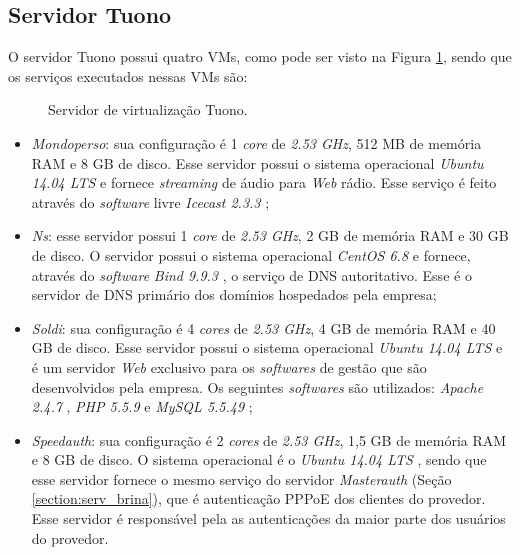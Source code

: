 \subsection{Servidor Tuono}
\label{section:serv_tuono}

O servidor Tuono possui quatro \ac{VM}s, como pode ser visto na Figura \ref{fig:servidor_tuono}, sendo que os serviços executados nessas \ac{VM}s
são:

\begin{figure}[h!]
 \centering
 \caption{Servidor de virtualização Tuono.}
 \label{fig:servidor_tuono}
\end{figure}

\begin{itemize}
 \item \textit{Mondoperso}: sua configuração é 1 \textit{core} de \textit{2.53 GHz}, 512 MB de memória \ac{RAM} e 8 GB de disco. 
 Esse servidor possui o sistema operacional \textit{Ubuntu 14.04 \ac{LTS}} \cite{ubuntu} e fornece \textit{streaming} de áudio para \textit{Web} 
 rádio. Esse serviço é feito através do \textit{software} livre \textit{Icecast 2.3.3} \cite{icecast};
 
 \item \textit{Ns}: esse servidor possui 1 \textit{core} de \textit{2.53 GHz}, 2 GB de memória \ac{RAM} e 30 GB de disco. O servidor possui o sistema 
 operacional \textit{CentOS 6.8} \cite{centos} e fornece, através do \textit{software} \textit{Bind 9.9.3} \cite{bind}, o serviço de \ac{DNS} 
 autoritativo. Esse é o servidor de \ac{DNS} primário dos domínios hospedados pela empresa;

 \item \textit{Soldi}: sua configuração é 4 \textit{cores} de \textit{2.53 GHz}, 4 GB de memória \ac{RAM} e 40 GB de disco. 
 Esse servidor possui o sistema operacional \textit{Ubuntu 14.04 \ac{LTS}} \cite{ubuntu} e é um servidor \textit{Web} exclusivo para os
 \textit{softwares} de gestão que são desenvolvidos pela empresa. Os seguintes \textit{softwares} são utilizados: \textit{Apache 2.4.7} 
 \cite{apache}, \textit{\ac{PHP} 5.5.9} \cite{php} e \textit{MySQL 5.5.49} \cite{mysql};

 \item \textit{Speedauth}: sua configuração é 2 \textit{cores} de \textit{2.53 GHz}, 1,5 GB de memória \ac{RAM} e 8 GB de disco. 
 O sistema operacional é o \textit{Ubuntu 14.04 \ac{LTS}} \cite{ubuntu}, sendo que esse servidor fornece o mesmo serviço do servidor 
 \textit{Masterauth} (Seção \ref{section:serv_brina}), que é autenticação \ac{PPPoE} dos clientes do provedor. Esse servidor é responsável pela 
 as autenticações da maior parte dos usuários do provedor.
\end{itemize}

